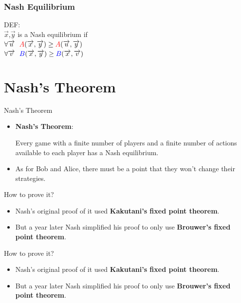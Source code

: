 \documentclass{beamer}
\begin{document}
\begin{frame}
\frametitle{Nash Equilibrium}
DEF:\\
\qquad $\overrightarrow{x}$,$\overrightarrow{y}$ is a Nash equilibrium if\\
\qquad $\forall \overrightarrow{u} ~~{\color{red}A}(\overrightarrow{x},\overrightarrow{y}) \geq{\color{red}A}(\overrightarrow{u},\overrightarrow{y})$\\
\qquad $\forall \overrightarrow{v} ~~{\color{blue}B}(\overrightarrow{x},\overrightarrow{y}) \geq{\color{blue}B}(\overrightarrow{x},\overrightarrow{v})$
\end{frame}


\section{Nash's Theorem}
\begin{frame}{Nash's Theorem}
	\begin{itemize}[<+->]
		\item \textbf{\large Nash's Theorem}:
		
		\qquad Every game with a finite number of players and a finite number of actions
		available to each player has a Nash equilibrium.
		\item As for Bob and Alice, there must be a point that they won't change their strategies.
	\end{itemize}
\end{frame}

\begin{frame}[fragile]{How to prove it?}
\begin{itemize}[<+->]
	\item Nash's original proof of it used \textbf{Kakutani's fixed point theorem}.
	\item But a year later Nash simplified his proof to only use \textbf{Brouwer’s fixed point theorem}.
\end{itemize}
\end{frame}

\begin{frame}[fragile]{How to prove it?}
	\begin{itemize}
		\item Nash's original proof of it used \textbf{Kakutani's fixed point theorem}.
		\item But a year later Nash simplified his proof to only use \textbf{\color{red}\large Brouwer’s fixed point theorem}.
	\end{itemize}
\end{frame}
\end{document}
